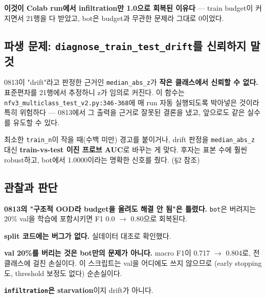 \textbf{이것이 Colab run에서 infiltration만 1.0으로 회복된 이유다} — train budget이 커지면서 21행을 다 받았고, bot은 budget과 무관한 문제라 그대로 0이었다.

\subsection{파생 문제: \texttt{diagnose\allowbreak{}\_\allowbreak{}\allowbreak{}train\_\allowbreak{}\allowbreak{}t\allowbreak{}est\_\allowbreak{}\allowbreak{}drif\allowbreak{}t}를 신뢰하지 말 것}
0813이 "drift"라고 판정한 근거인 \texttt{median\_\allowbreak{}\allowbreak{}a\allowbreak{}bs\_\allowbreak{}\allowbreak{}z}가 \textbf{작은 클래스에서 신뢰할 수 없다.} 표준편차를 21행에서 추정하니 z가 임의로 커진다. 이 함수는 \texttt{nfv3\_\allowbreak{}\allowbreak{}mul\allowbreak{}ticlass\_\allowbreak{}\allowbreak{}test\_\allowbreak{}\allowbreak{}v2.\allowbreak{}py:346-\allowbreak{}3\allowbreak{}68}에 매 run 자동 실행되도록 박아넣은 것이라 특히 위험하다 — 0813에서 그 출력을 근거로 잘못된 결론을 냈고, 앞으로도 같은 실수를 유도할 수 있다.

최소한 \texttt{train\_\allowbreak{}\allowbreak{}n}이 작을 때(수백 미만) 경고를 붙이거나, drift 판정을 \texttt{median\_\allowbreak{}\allowbreak{}a\allowbreak{}bs\_\allowbreak{}\allowbreak{}z} 대신 \textbf{train-vs-test 이진 프로브 AUC}로 바꾸는 게 맞다. 후자는 표본 수에 훨씬 robust하고, bot에서 1.0000이라는 명확한 신호를 줬다. (§2 참조)

\subsection{관찰과 판단}
\par\noindent \textbullet\enspace \textbf{0813의 "구조적 OOD라 budget을 올려도 해결 안 됨"은 틀렸다.} \texttt{bot}은 버려지는 20\% val을 학습에 포함시키면 F1 0.0  \ensuremath{\rightarrow}  0.80으로 회복된다.


\par\noindent \textbullet\enspace \textbf{split 코드에는 버그가 없다.} 실데이터 대조로 확인했다.


\par\noindent \textbullet\enspace \textbf{val 20\%를 버리는 것은 bot만의 문제가 아니다.} macro F1이 0.717  \ensuremath{\rightarrow}  0.804로, 전 클래스에 걸친 손실이다. 이 스크립트는 val을 어디에도 쓰지 않으므로 (early stopping도, threshold 보정도 없다) 순손실이다.


\par\noindent \textbullet\enspace \textbf{\texttt{infiltra\allowbreak{}tion}은 starvation}이지 drift가 아니다.



